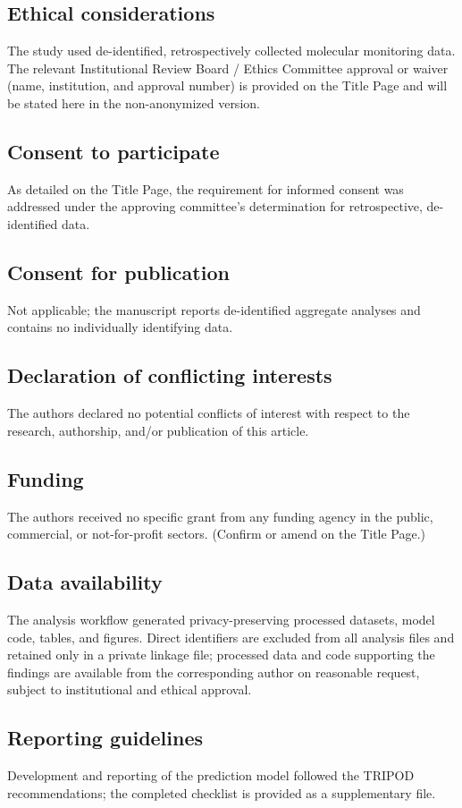 \documentclass[11pt]{article}
\begin{document}
\subsection*{Ethical considerations}
The study used de-identified, retrospectively collected molecular
monitoring data. The relevant Institutional Review Board / Ethics
Committee approval or waiver (name, institution, and approval number) is
provided on the Title Page and will be stated here in the non-anonymized
version.

\subsection*{Consent to participate}
As detailed on the Title Page, the requirement for informed consent was
addressed under the approving committee's determination for retrospective,
de-identified data.

\subsection*{Consent for publication}
Not applicable; the manuscript reports de-identified aggregate analyses and
contains no individually identifying data.

\subsection*{Declaration of conflicting interests}
The authors declared no potential conflicts of interest with respect to the
research, authorship, and/or publication of this article.

\subsection*{Funding}
The authors received no specific grant from any funding agency in the
public, commercial, or not-for-profit sectors. (Confirm or amend on the
Title Page.)

\subsection*{Data availability}
The analysis workflow generated privacy-preserving processed datasets,
model code, tables, and figures. Direct identifiers are excluded from all
analysis files and retained only in a private linkage file; processed data
and code supporting the findings are available from the corresponding
author on reasonable request, subject to institutional and ethical
approval.

\subsection*{Reporting guidelines}
Development and reporting of the prediction model followed the TRIPOD
recommendations; the completed checklist is provided as a supplementary
file.



\end{document}
